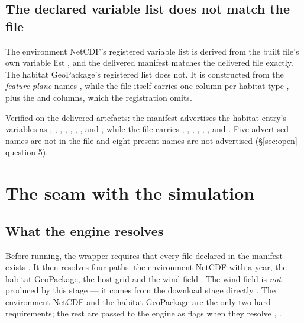 \documentclass[11pt,a4paper]{article} \usepackage[utf8]{inputenc} \usepackage{lmodern} \usepackage[T1]{fontenc}
\begin{document}
\subsection{The declared variable list does not match the file}

The environment NetCDF's registered variable list is derived from the built file's own variable
list , and the delivered manifest
matches the delivered file exactly. The habitat GeoPackage's registered list does not. It is
constructed from the \emph{feature plane} names
, while the file itself carries one
 column per habitat type
, plus the  and 
columns, which the registration omits.

Verified on the delivered artefacts: the manifest advertises the habitat entry's variables as
, , , ,
, , ,
 and , while the file carries
, , ,
, , ,
 and . Five advertised names are not in the file and eight present
names are not advertised (\S\ref{sec:open} question 5).

\section{The seam with the simulation} \label{sec:seam}

\subsection{What the engine resolves}

Before running, the wrapper requires that every file declared in the manifest exists
. It then resolves four paths: the
environment NetCDF with a year, the habitat GeoPackage, the host grid and the wind field
. The wind field is
\emph{not} produced by this stage --- it comes from the download stage directly
. The environment NetCDF and the habitat
GeoPackage are the only two hard requirements; the rest are passed to the engine as flags when
they resolve ,
.
\end{document}
